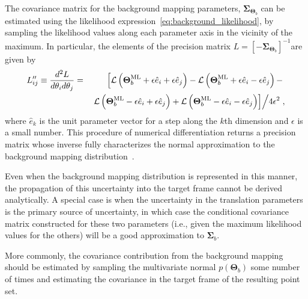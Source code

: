 \documentclass[manuscript]{aastex}
\newcommand{\bsS}{\boldsymbol\Sigma}
\newcommand{\bsT}{\boldsymbol\Theta}
\begin{document}
The covariance matrix for the background mapping parameters, $\bsS_{\bsT_b}$ can be estimated using the likelihood expression~\eqref{eq:background_likelihood}, by sampling the likelihood values along each parameter axis in the vicinity of the maximum. In particular, the elements of the precision matrix $L = \left[-\bsS_{\bsT_b}\right]^{-1}$are given by
\begin{eqnarray}
L''_{ij} \equiv \frac{d^2L}{d\theta_id\theta_j}= &&\left.\left[\mathcal{L}\left(\bsT_b^\mathrm{ML}+\epsilon\hat{e}_i+\epsilon\hat{e}_j\right) - \mathcal{L}\left(\bsT_b^\mathrm{ML}+\epsilon\hat{e}_i-\epsilon\hat{e}_j\right) - \right.\right.\\ && \left.\left.\mathcal{L}\left(\bsT_b^\mathrm{ML}-\epsilon\hat{e}_i+\epsilon\hat{e}_j\right) + \mathcal{L}\left(\bsT_b^\mathrm{ML}-\epsilon\hat{e}_i-\epsilon\hat{e}_j\right)\right]\middle/4\epsilon^2\right.,
\end{eqnarray}
where $\hat{e}_k$ is the unit parameter vector for a step along the $k$th dimension and $\epsilon$ is a small number. This procedure of numerical differentiation returns a precision matrix whose inverse fully characterizes the normal approximation to the background mapping distribution~\citep{gelman2004bayesian}.

Even when the background mapping distribution is represented in this manner, the propagation of this uncertainty into the target frame cannot be derived analytically. A special case is when the uncertainty in the translation parameters is the primary source of uncertainty, in which case the conditional covariance matrix constructed for these two parameters (i.e., given the maximum likelihood values for the others) will be a good approximation to $\bsS_b$.

More commonly, the covariance contribution from the background mapping should be estimated by sampling the multivariate normal $p(\bsT_b)$ some number of times and estimating the covariance in the target frame of the resulting point set.


\end{document}
